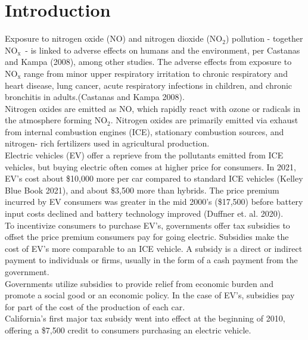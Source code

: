 \documentclass[12pt]{article}
\newcommand\tab[1][.50cm]{\hspace*{#1}}
\begin{document}
	
	\section*{Introduction}
	\begin{multicols}{2}
		Exposure to nitrogen oxide ($\text{NO}$) and nitrogen dioxide ($\text{NO}_\text{2}$) pollution - together $\text{NO}_\text{x}$\ - is linked to adverse effects on humans and the environment, per Castanas and Kampa (2008), among other studies. The adverse effects from exposure to $\text{NO}_\text{x}$ range from minor upper respiratory irritation to chronic respiratory and heart disease, lung cancer, acute respiratory infections in children, and chronic bronchitis in adults.(Castanas and Kampa 2008).\\
		\tab Nitrogen oxides are emitted as $\text{NO}$, which rapidly react with ozone or radicals in the atmosphere forming $\text{NO}_\text{2}$. Nitrogen oxides are primarily emitted via exhaust from internal combustion engines (ICE), stationary combustion sources, and nitrogen- rich fertilizers used in agricultural production. \\
		\tab Electric vehicles (EV) offer a reprieve from the pollutants emitted from ICE vehicles, but buying electric often comes at higher price for consumers. In 2021, EV's cost about \$10,000 more per car compared to standard ICE vehicles (Kelley Blue Book 2021), and about \$3,500 more than hybrids. The price premium incurred by EV consumers was greater in the mid 2000's (\$17,500) before battery input costs declined and battery technology improved (Duffner et. al. 2020).\\
		\tab To incentivize consumers to purchase EV's, governments offer tax subsidies to offset the price premium consumers pay for going electric. Subsidies make the cost of EV's more comparable to an ICE vehicle. A subsidy is a direct or indirect payment to individuals or firms, usually in the form of a cash payment from the government.\\
		\tab Governments utilize subsidies to provide relief from economic burden and promote a social good or an economic policy. In the case of EV's, subsidies pay for part of the cost of the production of each car. \\ 
		\tab California's first major tax subsidy went into effect at the beginning of 2010, offering a \$7,500 credit to consumers purchasing an electric vehicle. \\

\end{multicols}
\end{document}
